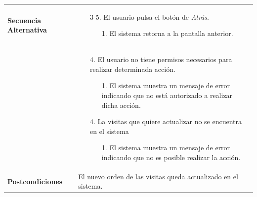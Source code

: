 \begin{longtable}{| p{4cm} | p{10cm} |}
\\
\hline
\textbf{Secuencia Alternativa} &\mbox{}\par\vspace{-\baselineskip}
\begin{enumerate}[leftmargin=0.9cm, topsep=0.1cm]
\item[3-5.] El usuario pulsa el botón de \textit{Atrás}.
	\begin{itemize}
	\item[1.] El sistema retorna a la pantalla anterior.
	\end{itemize}
\end{enumerate}
\\ &\mbox{}\par\vspace{-\baselineskip}	
\begin{enumerate}[leftmargin=0.7cm, topsep=0.1cm]
\item[4.] El usuario no tiene permisos necesarios para realizar determinada acción.
	\begin{itemize}
	\item[1.] El sistema muestra un mensaje de error indicando que no está autorizado a realizar dicha acción.
	\end{itemize}
\item[4.] La visitas que quiere actualizar no se encuentra en el sistema
	\begin{itemize}
	\item[1.] El sistema muestra un mensaje de error indicando que no es posible realizar la acción.
	\end{itemize}
\end{enumerate}
\\

\hline
\textbf{Postcondiciones} & 
El nuevo orden de las visitas queda actualizado en el sistema.\\
\hline
\end{longtable}



\newpage
